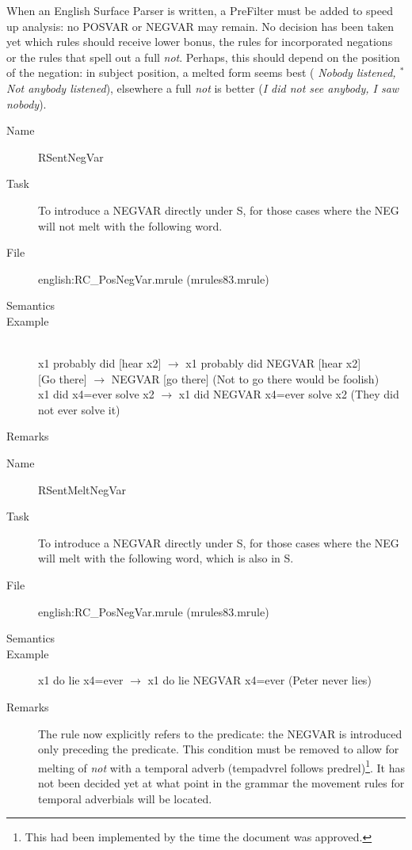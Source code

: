 \begin{description}
When an English Surface Parser is written, a PreFilter must be added to speed 
up analysis: no POSVAR or NEGVAR may remain. No decision has been taken yet 
which rules should receive lower bonus, the rules for incorporated negations 
or the 
rules that spell out a full {\em not\/}. Perhaps, this should depend on the 
position of the negation: in subject position, a melted form seems best ({\em 
Nobody listened, $^{*}$Not anybody listened\/}), elsewhere a full {\em not\/} 
is better ({\em I did not see anybody, I saw nobody\/}).

\vspace{1 cm}
\begin{description}
\item[Name] RSentNegVar
\item[Task] To introduce a NEGVAR directly under S, for those cases where the 
NEG will not melt with the following word.
\item[File] english:RC\_PosNegVar.mrule (mrules83.mrule)
\item[Semantics]
\item[Example] \mbox{}\\
x1 probably did [hear x2] $\rightarrow$ x1 probably did NEGVAR [hear x2] \\ 
{[Go there]} $\rightarrow$ NEGVAR [go there] (Not to go there would be 
foolish)\\
x1 did x4=ever solve x2 $\rightarrow$ x1 did NEGVAR x4=ever solve x2 (They did 
not ever solve it)
\item[Remarks]
\end{description}

\vspace{1 cm}
\begin{description}
\item[Name] RSentMeltNegVar
\item[Task] To introduce a NEGVAR directly under S, for those cases where the 
NEG will melt with the following word, which is also in S.
\item[File] english:RC\_PosNegVar.mrule (mrules83.mrule)
\item[Semantics] 
\item[Example] 
x1 do lie x4=ever $\rightarrow$ x1 do lie NEGVAR x4=ever (Peter never lies)
\item[Remarks] The rule now explicitly refers to the predicate: the NEGVAR is 
introduced only preceding the predicate. This condition must be removed to 
allow for melting of {\em not\/} with a temporal adverb (tempadvrel follows 
predrel)\footnote{This had been implemented by the time the document was 
approved.}. 
It has not been decided yet at what point in the grammar the movement 
rules for temporal adverbials will be located.
\end{description}


\end{description}
